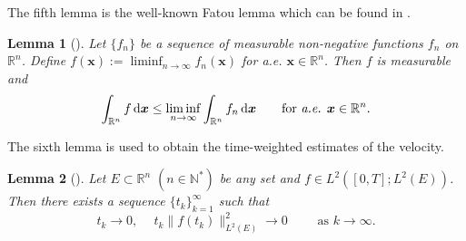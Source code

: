 \documentclass[11pt,reqno]{amsart}
\newtheorem{lem}{Lemma}[section]
\numberwithin{rk}{section}
\numberwithin{prop}{section}
\numberwithin{mydef}{section}
\numberwithin{lem}{section}
\numberwithin{equation}{section}
\numberwithin{thm}{section}
\begin{document}
The fifth lemma is the well-known Fatou lemma which can be found in \cite{realrudin}.
\begin{lem}[\cite{realrudin}]\label{Fatou}
Let  $\{f_n\}$ be a sequence of measurable non-negative functions $f_n$ on $\mathbb{R}^n$. Define $f(\boldsymbol{x}):= \liminf_{n\to \infty} f_n(\boldsymbol{x})$ for {\it a.e.} $\boldsymbol{x}\in \mathbb{R}^n$. Then $f$ is measurable and
\begin{equation*}
\int_{\mathbb{R}^n} f \,\mathrm{d}\boldsymbol{x} \leq \liminf_{n\to \infty} \int_{\mathbb{R}^n} f_n \,\mathrm{d}\boldsymbol{x} \qquad \text{for {\it a.e.} $\boldsymbol{x}\in \mathbb{R}^n$}.
\end{equation*}
\end{lem}
 

The sixth lemma is used to obtain the time-weighted estimates of the velocity.
\begin{lem}[\cite{bjr,CZZ1}]\label{bjr}
Let $E\subset \mathbb{R}^n$ $(n\in \mathbb{N}^*)$ be any set and $f\in L^2([0,T]; L^2(E))$. Then there exists a sequence $\{t_k\}_{k=1}^\infty$ such that
\begin{equation*}
t_k\to 0, \quad\ t_k \|f(t_k)\|^2_{L^2(E)}\to 0 \qquad\,\, \text{as $k\to\infty$}.
\end{equation*}
\end{lem}
\end{document}
